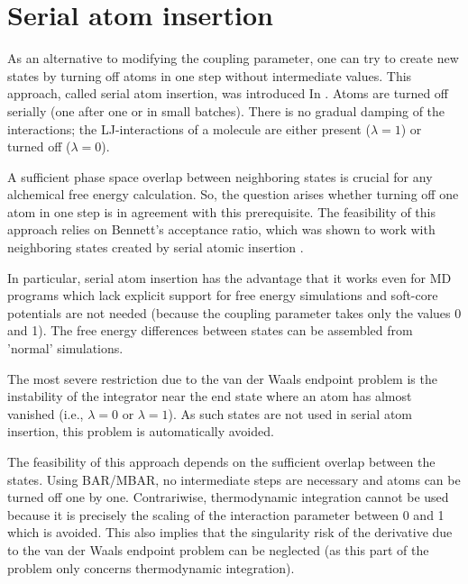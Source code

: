 \section{Serial atom insertion}

As an alternative to modifying the coupling parameter, one can
try to create new states by turning off atoms in one step without
intermediate values. This approach, called serial atom insertion, was introduced In \cite{Boresch.2011}. Atoms are turned off serially (one after one
or in small batches). There is no gradual damping of the interactions; the
LJ-interactions of a molecule are either present ($\lambda=1$) or
turned off ($\lambda=0$).

A sufficient phase space overlap between neighboring states is crucial
for any alchemical free energy calculation. So, the question arises
whether turning off one atom in one step is in agreement with this prerequisite. The feasibility of this approach relies on Bennett's acceptance
ratio, which was shown to work with neighboring states created
by serial atomic insertion \cite{Boresch.2011}.

In particular, serial atom insertion has the advantage that it works
even for MD programs which lack explicit support for free energy
simulations and soft-core potentials are not needed (because the coupling
parameter takes only the values 0 and 1). The free energy differences
between states can be assembled from 'normal' simulations.

The most severe restriction due to the van der Waals endpoint
problem is the instability of the integrator near the end state where an atom has almost vanished (i.e.,  $\lambda=0$ or  $\lambda=1$). As such states
are not used in serial atom insertion, this problem is automatically
avoided.

The feasibility of this approach depends on the sufficient overlap
between the states. Using BAR/MBAR, no intermediate steps are necessary
and atoms can be turned off one by one. Contrariwise, thermodynamic
integration cannot be used because it is precisely the scaling of the
interaction parameter between 0 and 1 which is avoided. This also
implies that the singularity risk of the derivative due to the van
der Waals endpoint problem can be neglected (as this part of the problem
only concerns thermodynamic integration).